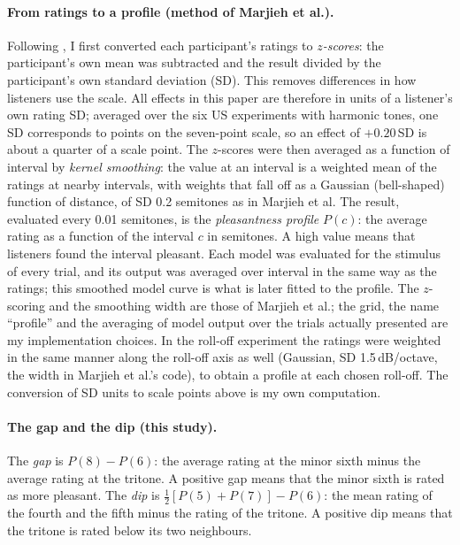 \documentclass[11pt,a4paper]{article}
\newcommand{\SDu}{\,SD}
\begin{document}
\paragraph{From ratings to a profile (method of Marjieh et al.).}
Following \citet{marjieh2024}, I first converted each participant's ratings to
\emph{$z$-scores}: the participant's own mean was subtracted and the result divided by the
participant's own standard deviation (SD). This removes differences in how listeners use the
scale. All effects in this paper are therefore in units of a listener's own rating SD; averaged
over the six US experiments with harmonic tones, one SD corresponds to \rawSDharm{} points on the seven-point scale, so an
effect of $+0.20$\SDu{} is about a quarter of a scale point. The $z$-scores were then
averaged as a function of interval by \emph{kernel smoothing}: the value at an interval is a
weighted mean of the ratings at nearby intervals, with weights that fall off as a Gaussian
(bell-shaped) function of distance, of SD 0.2 semitones as in Marjieh et al. The result,
evaluated every 0.01 semitones, is the \emph{pleasantness profile} $P(c)$: the average rating
as a function of the interval $c$ in semitones. A high value means that listeners found the
interval pleasant. Each model was evaluated for the stimulus of every trial, and its output was averaged over
interval in the same way as the ratings; this smoothed model curve is what is later fitted to
the profile. The $z$-scoring and the smoothing width are those of Marjieh et al.; the grid,
the name ``profile'' and the averaging of model output over the trials actually presented are
my implementation choices. In the roll-off experiment the
ratings were weighted in the same manner along the roll-off axis as well (Gaussian, SD
1.5\,dB/octave, the width in Marjieh et al.'s code), to obtain a profile at each chosen
roll-off. The conversion of SD units to scale points above is my own computation.

\paragraph{The gap and the dip (this study).}
The \emph{gap} is $P(8)-P(6)$: the average rating at the minor sixth minus the average rating
at the tritone. A positive gap means that the minor sixth is rated as more pleasant. The
\emph{dip} is $\tfrac12[P(5)+P(7)]-P(6)$: the mean rating of the fourth and the fifth minus
the rating of the tritone. A positive dip means that the tritone is rated below its two
neighbours.
\end{document}
